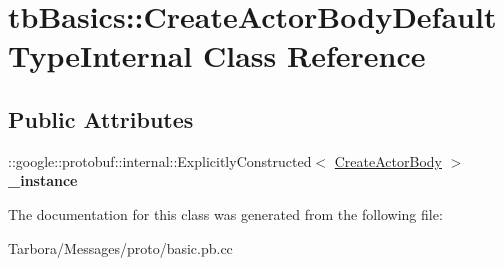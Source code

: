 \hypertarget{classtbBasics_1_1CreateActorBodyDefaultTypeInternal}{}\section{tb\+Basics\+:\+:Create\+Actor\+Body\+Default\+Type\+Internal Class Reference}
\label{classtbBasics_1_1CreateActorBodyDefaultTypeInternal}
\subsection*{Public Attributes}
\begin{DoxyCompactItemize}
\item 
\mbox{\label{classtbBasics_1_1CreateActorBodyDefaultTypeInternal_a2a20362d9a76eb2c3e5069e93ee24698}} 
\+::google\+::protobuf\+::internal\+::\+Explicitly\+Constructed$<$ \hyperlink{classtbBasics_1_1CreateActorBody}{Create\+Actor\+Body} $>$ {\bfseries \+\_\+instance}
\end{DoxyCompactItemize}


The documentation for this class was generated from the following file\+:\begin{DoxyCompactItemize}
\item 
Tarbora/\+Messages/proto/basic.\+pb.\+cc\end{DoxyCompactItemize}
